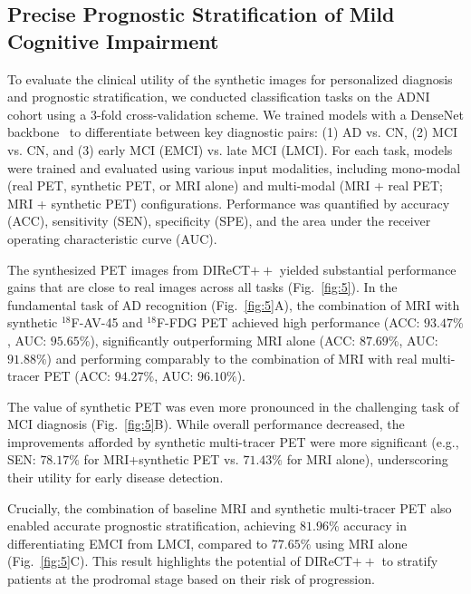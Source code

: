 \documentclass{article}
\begin{document}
\subsection{Precise Prognostic Stratification of Mild Cognitive Impairment}
To evaluate the clinical utility of the synthetic images for personalized diagnosis and prognostic stratification, we conducted classification tasks on the ADNI cohort using a 3-fold cross-validation scheme. We trained models with a DenseNet backbone~\cite{huang2017densely} to differentiate between key diagnostic pairs: (1) AD vs. CN, (2) MCI vs. CN, and (3) early MCI (EMCI) vs. late MCI (LMCI). For each task, models were trained and evaluated using various input modalities, including mono-modal (real PET, synthetic PET, or MRI alone) and multi-modal (MRI + real PET; MRI + synthetic PET) configurations. Performance was quantified by accuracy (ACC), sensitivity (SEN), specificity (SPE), and the area under the receiver operating characteristic curve (AUC).

The synthesized PET images from DIReCT$++$ yielded substantial performance gains that are close to real images across all tasks (Fig.~\ref{fig:5}). In the fundamental task of AD recognition (Fig.~\ref{fig:5}A), the combination of MRI with synthetic $^{18}$F-AV-45 and $^{18}$F-FDG PET achieved high performance (ACC: $93.47\%$, AUC: $95.65\%$), significantly outperforming MRI alone (ACC: $87.69\%$, AUC: $91.88\%$) and performing comparably to the combination of MRI with real multi-tracer PET (ACC: $94.27\%$, AUC: $96.10\%$).

The value of synthetic PET was even more pronounced in the challenging task of MCI diagnosis (Fig.~\ref{fig:5}B). While overall performance decreased, the improvements afforded by synthetic multi-tracer PET were more significant (e.g., SEN: $78.17\%$ for MRI+synthetic PET vs. $71.43\%$ for MRI alone), underscoring their utility for early disease detection.

Crucially, the combination of baseline MRI and synthetic multi-tracer PET also enabled accurate prognostic stratification, achieving $81.96\%$ accuracy in differentiating EMCI from LMCI, compared to $77.65\%$ using MRI alone (Fig.~\ref{fig:5}C). This result highlights the potential of DIReCT$++$ to stratify patients at the prodromal stage based on their risk of progression.
\end{document}
